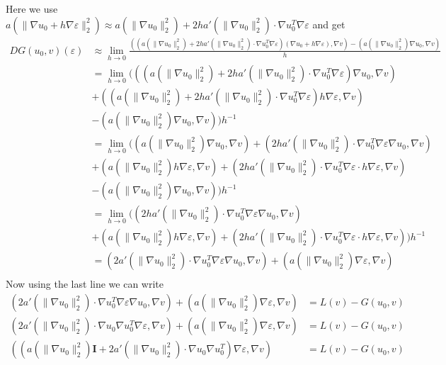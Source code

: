 \documentclass[a4paper]{article}
\begin{document}
Here we use $a(\|\nabla u_0+h\nabla \varepsilon\|_2^2)\approx a(\|\nabla u_0\|_2^2)+2ha'(\|\nabla u_0\|_2^2)\cdot \nabla u_0^T\nabla \varepsilon$ and get
\begin{align*}
DG(u_0,v)(\varepsilon) &\approx \lim_{h\rightarrow 0} \frac{\left( (a\left(\|\nabla u_0 \|_2^2\right)+2ha'(\|\nabla u_0\|_2^2)\cdot \nabla u_0^T\nabla \varepsilon) \left(\nabla u_0+h\nabla \varepsilon\right),\nabla v\right) - \left(a\left(\|\nabla u_0\|_2^2\right) \nabla u_0 ,\nabla v\right)}{h} \\
%
&= \lim_{h\rightarrow 0} \Big(
\left( (a\left(\|\nabla u_0 \|_2^2\right)+2ha'(\|\nabla u_0\|_2^2)\cdot \nabla u_0^T\nabla \varepsilon) \nabla u_0,\nabla v\right) \\
&+\left( (a\left(\|\nabla u_0 \|_2^2\right)+2ha'(\|\nabla u_0\|_2^2)\cdot \nabla u_0^T\nabla \varepsilon) h\nabla \varepsilon,\nabla v\right) \\
&- \left(a\left(\|\nabla u_0\|_2^2\right) \nabla u_0 ,\nabla v\right)
\Big)h^{-1} \\
%
&= \lim_{h\rightarrow 0} \Big(
\left( a\left(\|\nabla u_0 \|_2^2\right) \nabla u_0,\nabla v\right)
+\left( 2ha'(\|\nabla u_0\|_2^2)\cdot \nabla u_0^T\nabla \varepsilon \nabla u_0,\nabla v\right) \\
&+\left( a\left(\|\nabla u_0 \|_2^2\right) h\nabla \varepsilon,\nabla v\right) 
+\left( 2ha'(\|\nabla u_0\|_2^2)\cdot \nabla u_0^T\nabla \varepsilon \cdot h\nabla\varepsilon,\nabla v\right) \\
&- \left(a\left(\|\nabla u_0\|_2^2\right) \nabla u_0 ,\nabla v\right)\Big)h^{-1} \\
&= \lim_{h\rightarrow 0} \Big(
\left( 2ha'(\|\nabla u_0\|_2^2)\cdot \nabla u_0^T\nabla \varepsilon \nabla u_0,\nabla v\right) \\
&+\left( a\left(\|\nabla u_0 \|_2^2\right) h\nabla \varepsilon,\nabla v\right) 
+\left( 2ha'(\|\nabla u_0\|_2^2)\cdot \nabla u_0^T\nabla \varepsilon \cdot h\nabla\varepsilon,\nabla v\right)\Big)h^{-1} \\
&= 
\left( 2a'(\|\nabla u_0\|_2^2)\cdot \nabla u_0^T\nabla \varepsilon \nabla u_0,\nabla v\right) 
+\left( a\left(\|\nabla u_0 \|_2^2\right) \nabla \varepsilon,\nabla v\right)  \\
\end{align*}
Now using the last line we can write
\begin{align*}
\left( 2a'(\|\nabla u_0\|_2^2)\cdot \nabla u_0^T\nabla \varepsilon \nabla u_0,\nabla v\right) 
+\left( a\left(\|\nabla u_0 \|_2^2\right) \nabla \varepsilon,\nabla v\right)  &= L(v)-G(u_0,v) \\
\left( 2a'(\|\nabla u_0\|_2^2)\cdot \nabla u_0 \nabla u_0^T\nabla \varepsilon,\nabla v\right) 
+\left( a\left(\|\nabla u_0 \|_2^2\right) \nabla \varepsilon,\nabla v\right)  &= L(v)-G(u_0,v) \\
\left( \left(a\left(\|\nabla u_0 \|_2^2\right)\mathbf{I}+2a'(\|\nabla u_0\|_2^2)\cdot \nabla u_0 \nabla u_0^T\right)\nabla \varepsilon,\nabla v\right) &= L(v)-G(u_0,v) \\
\end{align*}
\end{document}
